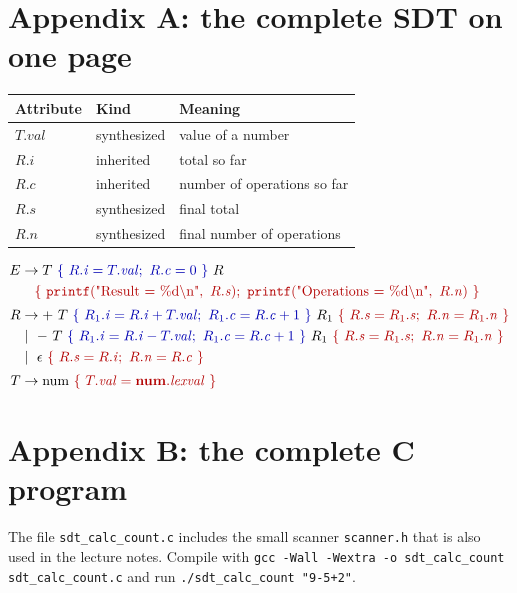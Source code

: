 \documentclass[11pt,a4paper]{article}
\newcommand{\at}[2]{\ensuremath{#1.\mathit{#2}}}
\newcommand{\inh}[1]{\textcolor{blue!70!black}{#1}}   %
\newcommand{\syn}[1]{\textcolor{red!70!black}{#1}}    %
\begin{document}
\appendix
\section*{Appendix A: the complete SDT on one page}

\begin{center}
\small
\begin{tabular}{@{}l l l@{}}
\toprule
\textbf{Attribute} & \textbf{Kind} & \textbf{Meaning} \\ \midrule
$T.val$ & \syn{synthesized} & value of a number \\
$R.i$ & \inh{inherited} & total so far \\
$R.c$ & \inh{inherited} & number of operations so far \\
$R.s$ & \syn{synthesized} & final total \\
$R.n$ & \syn{synthesized} & final number of operations \\ \bottomrule
\end{tabular}
\end{center}

\[
\begin{aligned}
E &\to T\ \inh{\{\ \at{R}{i}=\at{T}{val};\ \at{R}{c}=0\ \}}\ R\\
  &\quad\syn{\{\ \texttt{printf}(\text{"Result = \%d\textbackslash n"},\ \at{R}{s});\ \texttt{printf}(\text{"Operations = \%d\textbackslash n"},\ \at{R}{n})\ \}}\\[2pt]
R &\to +\ T\ \inh{\{\ \at{R_1}{i}=\at{R}{i}+\at{T}{val};\ \at{R_1}{c}=\at{R}{c}+1\ \}}\ R_1\ \syn{\{\ \at{R}{s}=\at{R_1}{s};\ \at{R}{n}=\at{R_1}{n}\ \}}\\
  &\mid\ -\ T\ \inh{\{\ \at{R_1}{i}=\at{R}{i}-\at{T}{val};\ \at{R_1}{c}=\at{R}{c}+1\ \}}\ R_1\ \syn{\{\ \at{R}{s}=\at{R_1}{s};\ \at{R}{n}=\at{R_1}{n}\ \}}\\
  &\mid\ \epsilon\ \syn{\{\ \at{R}{s}=\at{R}{i};\ \at{R}{n}=\at{R}{c}\ \}}\\[2pt]
T &\to \text{num}\ \syn{\{\ \at{T}{val}=\at{\mathbf{num}}{lexval}\ \}}
\end{aligned}
\]

\section*{Appendix B: the complete C program}
The file \texttt{sdt\_calc\_count.c} includes the small scanner \texttt{scanner.h} that is also used in the lecture notes. Compile with \texttt{gcc -Wall -Wextra -o sdt\_calc\_count sdt\_calc\_count.c} and run \texttt{./sdt\_calc\_count "9-5+2"}.
\end{document}
